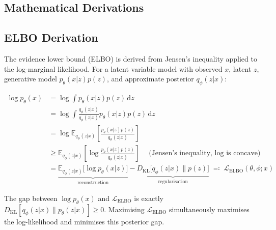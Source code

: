 \documentclass[12pt, a4paper, twoside, openright]{book}
\begin{document}
\begin{appendices}
\chapter{Mathematical Derivations}
\label{app:maths}

\section{ELBO Derivation}
\label{app:maths:elbo}

The evidence lower bound (ELBO) is derived from Jensen's inequality applied to the log-marginal likelihood. For a latent variable model with observed $x$, latent $z$, generative model $p_\theta(x|z)p(z)$, and approximate posterior $q_\phi(z|x)$:

\begin{align}
\log p_\theta(x) &= \log \int p_\theta(x|z) p(z) \, \mathrm{d}z \nonumber \\
&= \log \int \frac{q_\phi(z|x)}{q_\phi(z|x)} p_\theta(x|z) p(z) \, \mathrm{d}z \nonumber \\
&= \log \mathbb{E}_{q_\phi(z|x)}\!\left[\frac{p_\theta(x|z) p(z)}{q_\phi(z|x)}\right] \nonumber \\
&\geq \mathbb{E}_{q_\phi(z|x)}\!\left[\log \frac{p_\theta(x|z) p(z)}{q_\phi(z|x)}\right]
  \quad \text{(Jensen's inequality, $\log$ is concave)} \nonumber \\
&= \underbrace{\mathbb{E}_{q_\phi(z|x)}\bigl[\log p_\theta(x|z)\bigr]}_{\text{reconstruction}} -
   \underbrace{D_{\mathrm{KL}}\bigl[q_\phi(z|x) \| p(z)\bigr]}_{\text{regularisation}}
   \;\eqqcolon\; \mathcal{L}_{\mathrm{ELBO}}(\theta, \phi; x)
\label{eq:app:elbo}
\end{align}

The gap between $\log p_\theta(x)$ and $\mathcal{L}_{\mathrm{ELBO}}$ is exactly $D_{\mathrm{KL}}[q_\phi(z|x) \| p_\theta(z|x)] \geq 0$. Maximising $\mathcal{L}_{\mathrm{ELBO}}$ simultaneously maximises the log-likelihood and minimises this posterior gap.


\end{appendices}
\end{document}
